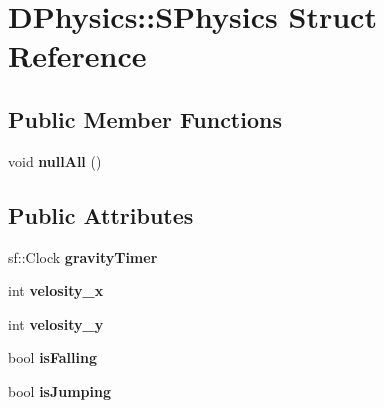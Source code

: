 \hypertarget{structDPhysics_1_1SPhysics}{\section{D\-Physics\-:\-:S\-Physics Struct Reference}
\label{structDPhysics_1_1SPhysics}
}
\subsection*{Public Member Functions}
\begin{DoxyCompactItemize}
\item 
\hypertarget{structDPhysics_1_1SPhysics_aa4cf9f9d5ae6ab52b53a76d7bc507e55}{void {\bfseries null\-All} ()}\label{structDPhysics_1_1SPhysics_aa4cf9f9d5ae6ab52b53a76d7bc507e55}

\end{DoxyCompactItemize}
\subsection*{Public Attributes}
\begin{DoxyCompactItemize}
\item 
\hypertarget{structDPhysics_1_1SPhysics_aee2f0f80a53a905eb9de32d3bb12e318}{sf\-::\-Clock {\bfseries gravity\-Timer}}\label{structDPhysics_1_1SPhysics_aee2f0f80a53a905eb9de32d3bb12e318}

\item 
\hypertarget{structDPhysics_1_1SPhysics_a2654e1fd65ea35fe4119c7866fd46274}{int {\bfseries velosity\-\_\-x}}\label{structDPhysics_1_1SPhysics_a2654e1fd65ea35fe4119c7866fd46274}

\item 
\hypertarget{structDPhysics_1_1SPhysics_a58c1f8fa61d0aeece450d7ab789c5013}{int {\bfseries velosity\-\_\-y}}\label{structDPhysics_1_1SPhysics_a58c1f8fa61d0aeece450d7ab789c5013}

\item 
\hypertarget{structDPhysics_1_1SPhysics_a39163a65d84fc6d7fd0be57560cffe12}{bool {\bfseries is\-Falling}}\label{structDPhysics_1_1SPhysics_a39163a65d84fc6d7fd0be57560cffe12}

\item 
\hypertarget{structDPhysics_1_1SPhysics_a6fc3e1a46d84fb6dec9f198bb6513856}{bool {\bfseries is\-Jumping}}\label{structDPhysics_1_1SPhysics_a6fc3e1a46d84fb6dec9f198bb6513856}

\end{DoxyCompactItemize}


